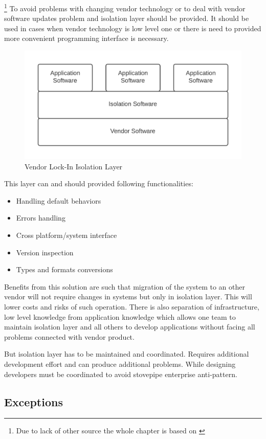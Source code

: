 \footnote{Due to lack of other source the whole chapter is based on \cite{SurvivalGuide}}
To avoid problems with changing vendor technology or to deal with vendor software updates problem and isolation layer should be provided. It should be used in cases when vendor technology is low level one or there is need to provided more convenient programming interface is necessary.

\begin{figure}[!h]
    \centering
    \includegraphics[scale=0.3]{Images/vendorsolution.png}
    \caption[Vendor Lock-In Isolation Layer]{Vendor Lock-In Isolation Layer \cite{SurvivalGuide}}
    \label{fig:vendorsolution}
\end{figure}

This layer can and should provided following functionalities:
\begin{itemize}
\item Handling default behaviors
\item Errors handling
\item Cross platform/system interface
\item Version inspection
\item Types and formats conversions
\end{itemize}
Benefits from this solution are such that migration of the system to an other vendor will not require changes in systems but only in isolation layer. This will lower costs and risks of such operation. There is also separation of infrastructure, low level knowledge from application knowledge which allows one team to maintain isolation layer and all others to develop applications without facing all problems connected with vendor product.

But isolation layer has to be maintained and coordinated. Requires additional development effort and can produce additional problems. While designing developers must be coordinated to avoid stovepipe enterprise anti-pattern.

\subsection{Exceptions}